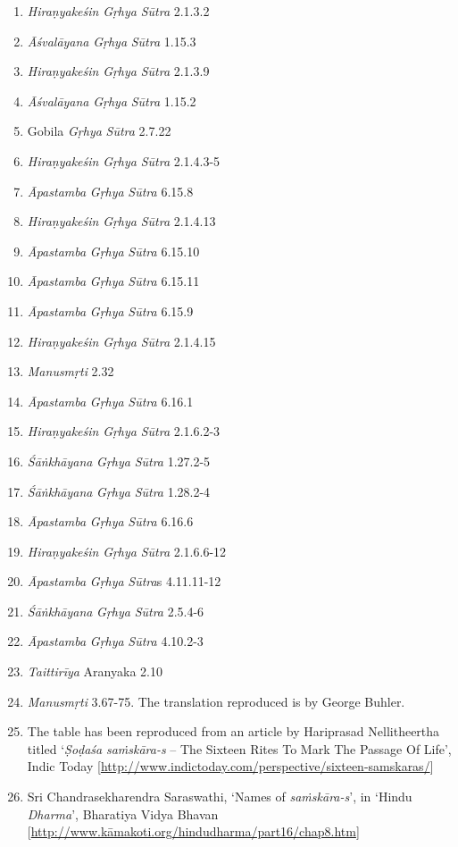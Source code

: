 \begin{enumerate}
\item
  \emph{Hiraṇyakeśin} \emph{Gṛhya} \emph{Sūtra} 2.1.3.2
\item
  \emph{Āśvalāyana} \emph{Gṛhya} \emph{Sūtra} 1.15.3
\item
  \emph{Hiraṇyakeśin} \emph{Gṛhya} \emph{Sūtra} 2.1.3.9
\item
  \emph{Āśvalāyana} \emph{Gṛhya} \emph{Sūtra} 1.15.2
\item
  Gobila \emph{Gṛhya} \emph{Sūtra} 2.7.22
\item
  \emph{Hiraṇyakeśin} \emph{Gṛhya} \emph{Sūtra} 2.1.4.3-5
\item
  \emph{Āpastamba} \emph{Gṛhya} \emph{Sūtra} 6.15.8
\item
  \emph{Hiraṇyakeśin} \emph{Gṛhya} \emph{Sūtra} 2.1.4.13
\item
  \emph{Āpastamba} \emph{Gṛhya} \emph{Sūtra} 6.15.10
\item
  \emph{Āpastamba} \emph{Gṛhya} \emph{Sūtra} 6.15.11
\item
  \emph{Āpastamba} \emph{Gṛhya} \emph{Sūtra} 6.15.9
\item
  \emph{Hiraṇyakeśin} \emph{Gṛhya} \emph{Sūtra} 2.1.4.15
\item
  \emph{Manusmṛti} 2.32
\item
  \emph{Āpastamba} \emph{Gṛhya} \emph{Sūtra} 6.16.1
\item
  \emph{Hiraṇyakeśin} \emph{Gṛhya} \emph{Sūtra} 2.1.6.2-3
\item
  \emph{Śāṅkhāyana} \emph{Gṛhya} \emph{Sūtra} 1.27.2-5
\item
  \emph{Śāṅkhāyana} \emph{Gṛhya} \emph{Sūtra} 1.28.2-4
\item
  \emph{Āpastamba} \emph{Gṛhya} \emph{Sūtra} 6.16.6
\item
  \emph{Hiraṇyakeśin} \emph{Gṛhya} \emph{Sūtra} 2.1.6.6-12
\item
  \emph{Āpastamba} \emph{Gṛhya} \emph{Sūtra}s 4.11.11-12
\item
  \emph{Śāṅkhāyana} \emph{Gṛhya} \emph{Sūtra} 2.5.4-6
\item
  \emph{Āpastamba} \emph{Gṛhya} \emph{Sūtra} 4.10.2-3
\item
  \emph{Taittirīya} Aranyaka 2.10
\item
  \emph{Manusmṛti} 3.67-75. The translation reproduced is by George Buhler.
\item
  The table has been reproduced from an article by Hariprasad Nellitheertha titled `\emph{Ṣoḍaśa} \emph{saṁskāra-s} -- The Sixteen Rites To Mark The Passage Of Life', Indic Today {[}\url{http://www.indictoday.com/perspective/sixteen-samskaras/}{]}
\item
  Sri Chandrasekharendra Saraswathi, `Names of \emph{saṁskāra-s}', in `Hindu \emph{Dharma}', Bharatiya Vidya Bhavan {[}\url{http://www.kāmakoti.org/hindudharma/part16/chap8.htm}{]}
\end{enumerate}
\newpage

